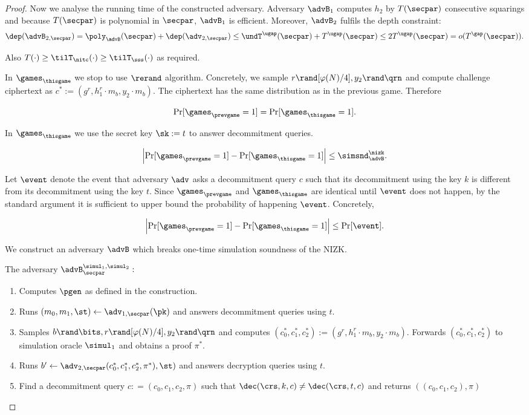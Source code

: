 \begin{proof}
Now we analyse the running time of the constructed adversary. Adversary $\advB_1$ computes $h_2$ by $T(\secpar)$ consecutive squarings and because $T(\secpar)$ is polynomial in $\secpar$, $\advB_1$ is efficient. Moreover, $\advB_2$ fulfils the depth constraint:
\[ \dep(\advB_{2,\secpar}) = \poly_\advB(\secpar) + \dep(\adv_{2,\secpar}) \leq \undT^{\ugap}(\secpar) + T^{\ugap}(\secpar) \leq 2 T^{\ugap}(\secpar) = o(T^{\gap}(\secpar)). \] 

Also $T(\cdot) \geq \tilT_\nitc(\cdot) \geq \tilT_\sss(\cdot)$ as required.

In $\games_\thisgame$ we stop to use $\rerand$ algorithm. Concretely, we sample $r \rand [\varphi(N)/4], y_2 \rand \qrn$ and compute challenge ciphertext as $c^*:=(g^r, h_1^r \cdot m_b, y_2 \cdot m_b)$. The ciphertext has the same distribution as in the previous game. Therefore 

\begin{lemma}
\[
\Pr[\games_\prevgame = 1] = \Pr[\games_\thisgame = 1].
\]
\end{lemma}
In $\games_\thisgame$ we use the secret key $\sk:=t$ to answer decommitment queries. 

\begin{lemma}
\[
\left|\Pr[\games_\prevgame = 1] - \Pr[\games_\thisgame = 1]\right| \leq \simsnd^\nizk_\advB. 
\]
\end{lemma}

Let $\event$ denote the event that adversary $\adv$ asks a decommitment query $c$ such that its decommitment using the key $k$ is different from its decommitment using the key $t$. Since $\games_\prevgame$ and $\games_\thisgame$ are identical until $\event$ does not happen, by the standard argument it is sufficient to upper bound the probability of happening $\event$. Concretely,  

\[
\left|\Pr[\games_\prevgame = 1] - \Pr[\games_\thisgame = 1]\right| \leq \Pr[\event]. 
\]

We construct an adversary $\advB$ which breaks one-time simulation soundness of the NIZK. 

The adversary $\advB_{\secpar}^{\simul_1, \simul_2}:$
\vspace{-2mm}
\begin{enumerate}
\item Computes $\pgen$ as defined in the construction.
\item Runs $(m_0, m_1, \st) \leftarrow \adv_{1, \secpar}(\pk)$ and answers decommitment queries using $t$.
\item Samples $b \rand \bits, r \rand [\varphi(N)/4], y_2 \rand \qrn$ and computes $(c_0^*, c_1^*, c_2^*):=(g^r, h_1^r \cdot m_b, y_2 \cdot m_b)$. Forwards $(c_0^*, c_1^*, c_2^*)$ to simulation oracle $\simul_1$ and obtains a proof $\pi^*$.
\item Runs $b' \leftarrow \adv_{2, \secpar}(c_0^*, c_1^*, c_2^*, \pi^*), \st)$ and answers decryption queries using $t$.
\item Find a decommitment query $c: = (c_0, c_1, c_2, \pi)$ such that $\dec(\crs, k, c) \neq \dec(\crs,t,c)$ and returns $((c_0, c_1, c_2), \pi)$
\end{enumerate}


\end{proof}
